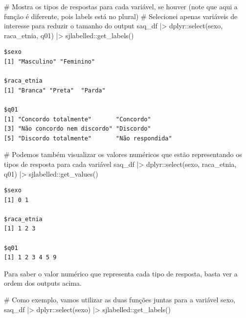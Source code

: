 \documentclass[
  letterpaper,
  DIV=11,
  numbers=noendperiod]{scrartcl}
\newenvironment{Shaded}{\begin{snugshade}}{\end{snugshade}}
\newcommand{\CommentTok}[1]{\textcolor[rgb]{0.37,0.37,0.37}{#1}}
\newcommand{\FunctionTok}[1]{\textcolor[rgb]{0.28,0.35,0.67}{#1}}
\newcommand{\NormalTok}[1]{\textcolor[rgb]{0.00,0.23,0.31}{#1}}
\newcommand{\SpecialCharTok}[1]{\textcolor[rgb]{0.37,0.37,0.37}{#1}}
\begin{document}
\begin{Shaded}
\begin{Highlighting}[]
\CommentTok{\# Mostra os tipos de respostas para cada variável, se houver (note que aqui a função é diferente, pois labels está no plural)}
\CommentTok{\# Selecionei apenas variáveis de interesse para reduzir o tamanho do output}
\NormalTok{saq\_df }\SpecialCharTok{|\textgreater{}} 
\NormalTok{  dplyr}\SpecialCharTok{::}\FunctionTok{select}\NormalTok{(sexo, raca\_etnia, q01) }\SpecialCharTok{|\textgreater{}} 
\NormalTok{  sjlabelled}\SpecialCharTok{::}\FunctionTok{get\_labels}\NormalTok{()}
\end{Highlighting}
\end{Shaded}

\begin{verbatim}
$sexo
[1] "Masculino" "Feminino" 

$raca_etnia
[1] "Branca" "Preta"  "Parda" 

$q01
[1] "Concordo totalmente"       "Concordo"                 
[3] "Não concordo nem discordo" "Discordo"                 
[5] "Discordo totalmente"       "Não respondida"           
\end{verbatim}

\begin{Shaded}
\begin{Highlighting}[]
\CommentTok{\# Podemos também visualizar os valores numéricos que estão representando os tipos de resposta para cada variável}
\NormalTok{saq\_df }\SpecialCharTok{|\textgreater{}} 
\NormalTok{  dplyr}\SpecialCharTok{::}\FunctionTok{select}\NormalTok{(sexo, raca\_etnia, q01) }\SpecialCharTok{|\textgreater{}} 
\NormalTok{  sjlabelled}\SpecialCharTok{::}\FunctionTok{get\_values}\NormalTok{()}
\end{Highlighting}
\end{Shaded}

\begin{verbatim}
$sexo
[1] 0 1

$raca_etnia
[1] 1 2 3

$q01
[1] 1 2 3 4 5 9
\end{verbatim}

Para saber o valor numérico que representa cada tipo de resposta, basta
ver a ordem dos outputs acima.

\begin{Shaded}
\begin{Highlighting}[]
\CommentTok{\# Como exemplo, vamos utilizar as duas funções juntas para a variável sexo,}
\NormalTok{saq\_df }\SpecialCharTok{|\textgreater{}} 
\NormalTok{  dplyr}\SpecialCharTok{::}\FunctionTok{select}\NormalTok{(sexo) }\SpecialCharTok{|\textgreater{}} 
\NormalTok{  sjlabelled}\SpecialCharTok{::}\FunctionTok{get\_labels}\NormalTok{()}
\end{Highlighting}
\end{Shaded}
\end{document}
